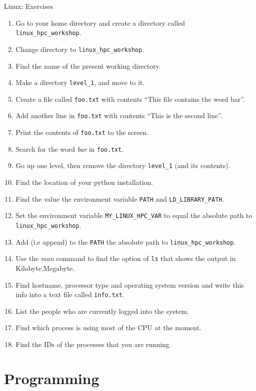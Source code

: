 \documentclass{beamer}
\begin{document}
\begin{frame}[allowframebreaks,t]{Linux: Exercises}
  \begin{enumerate}
    \item Go to your home directory and create a directory called \texttt{linux\_hpc\_workshop}.
    \item Change directory to \texttt{linux\_hpc\_workshop}.
    \item Find the name of the present working directory.
    \item Make a directory \texttt{level\_1}, and move to it.
    \item Create a file called \texttt{foo.txt} with contents ``This file contains the word bar''.
    \item Add another line in \texttt{foo.txt} with contents ``This is the second line''.
    \item Print the contents of \texttt{foo.txt} to the screen.
    \item Search for the word \emph{bar} in \texttt{foo.txt}.
    \item Go up one level, then remove the directory \texttt{level\_1} (and its contents).
    \item Find the location of your python installation.
    \item Find the value the environment variable \texttt{PATH} and \texttt{LD\_LIBRARY\_PATH}.
    \item Set the environment variable \texttt{MY\_LINUX\_HPC\_VAR} to equal the absolute path to \texttt{linux\_hpc\_workshop}.
    \item Add (i.e append) to the \texttt{PATH} the absolute path to \texttt{linux\_hpc\_workshop}.
    \item Use the \textit{man} command to find the option of \texttt{ls} that shows the output in Kilobyte,Megabyte.
    \item Find hostname, processor type and operating system version and write this info into a text file called \texttt{info.txt}.
    \item List the people who are currently logged into the system.
    \item Find which process is using most of the CPU at the moment.
    \item Find the IDs of the processes that you are running.
  \end{enumerate}
\end{frame}

\section{Programming}
\end{document}

